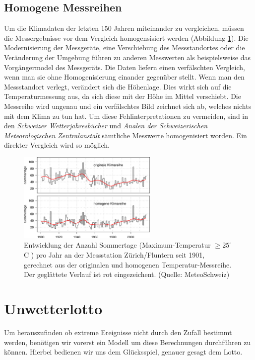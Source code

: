 \begin{refsection}
\subsection{Homogene Messreihen}
Um die Klimadaten der letzten 150 Jahren miteinander zu vergleichen, müssen die Messergebnisse vor dem Vergleich homogensisiert werden (Abbildung \ref{Homogen}). Die Modernisierung der Messgeräte,  eine Verschiebung des Messstandortes oder die Veränderung der Umgebung führen zu anderen Messwerten als beispielsweise das Vorgängermodel des Messgeräts. Die Daten liefern einen verfälschten Vergleich, wenn man sie ohne Homogenisierung einander gegenüber stellt.
Wenn man den Messstandort verlegt, verändert sich die Höhenlage. Dies wirkt sich auf die Temperaturmessung aus, da sich diese mit der Höhe im Mittel verschiebt. Die Messreihe wird ungenau und ein verfälschtes Bild zeichnet sich ab, welches nichts mit dem Klima zu tun hat.
Um diese Fehlinterpretationen zu vermeiden, sind in den \textit{Schweizer Wetterjahresbücher} und \textit{Analen der Schweizerischen Meteorologischen Zentralanstalt} sämtliche Messwerte homogenisiert worden. Ein direkter Vergleich wird so möglich.

\begin{figure}[htbp]
\centering
\includegraphics[width=0.6\textwidth]{extrem/Homogen.jpg}
\caption{Entwicklung der Anzahl Sommertage (Maximum-Temperatur $\ge 25^{\circ}$C ) pro Jahr an der Messstation Zürich/Fluntern seit 1901, gerechnet aus der originalen und homogenen Temperatur-Messreihe. Der geglättete Verlauf ist rot eingezeichent. (Quelle: MeteoSchweiz)}
\label{Homogen}
\end{figure}


\section{Unwetterlotto}
Um herauszufinden ob extreme Ereignisse nicht durch den Zufall bestimmt werden, benötigen wir vorerst ein Modell um diese Berechnungen durchführen zu können.
Hierbei bedienen wir uns dem Glücksspiel, genauer gesagt dem Lotto.


\end{refsection}
